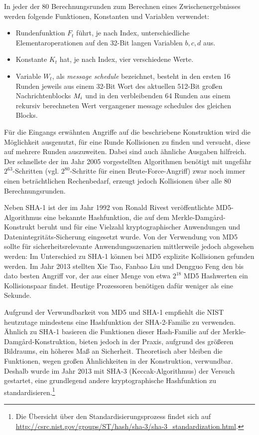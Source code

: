 In jeder der 80 Berechnungsrunden zum Berechnen eines Zwischenergebnisses werden folgende Funktionen, Konstanten und Variablen verwendet:
\begin{itemize}
	\item Rundenfunktion $F_{t}$ führt, je nach Index, unterschiedliche Elementaroperationen auf den 32-Bit langen Variablen $b, c, d$ aus.
	\item Konstante $K_{t}$ hat, je nach Index, vier verschiedene Werte.
	\item Variable $W_{t}$, als \textit{message schedule} bezeichnet, besteht in den ersten 16 Runden jeweils aus einem 32-Bit Wort des aktuellen 512-Bit großen Nachrichtenblocks $M_{i}$ und in den verbleibenden 64 Runden aus einem rekursiv berechneten Wert vergangener message schedules des gleichen Blocks.
\end{itemize}

Für die Eingangs erwähnten Angriffe auf die beschriebene Konstruktion wird die Möglichkeit ausgenutzt, für eine Runde Kollisionen zu finden und versucht, diese auf mehrere Runden auszuweiten. Dabei sind auch ähnliche Ausgaben hilfreich. Der schnellste der im Jahr 2005 vorgestellten Algorithmen benötigt mit ungefähr $2^{63}$-Schritten (vgl. $2^{80}$-Schritte für einen Brute-Force-Angriff) zwar noch immer einen beträchtlichen Rechenbedarf, erzeugt jedoch Kollisionen über alle 80 Berechnungsrunden.

Neben SHA-1 ist der im Jahr 1992 von Ronald Rivest veröffentlichte MD5-Algorithmus eine bekannte Hashfunktion, die auf dem Merkle-Damgård-Konstrukt beruht und für eine Vielzahl kryptographischer Anwendungen und Datenintegritäts-Sicherung eingesetzt wurde. Von der Verwendung von MD5 sollte für sicherheitsrelevante Anwendungsszenarien mittlerweile jedoch abgesehen werden: Im Unterschied zu SHA-1 können bei MD5 explizite Kollisionen gefunden werden. Im Jahr 2013 stellten Xie Tao, Fanbao Liu und Dengguo Feng den bis dato besten Angriff vor, der aus einer Menge von etwa $2^{18}$ MD5 Hashwerten ein Kollisionspaar findet. Heutige Prozessoren benötigen dafür weniger als eine Sekunde.

Aufgrund der Verwundbarkeit von MD5 und SHA-1 empfiehlt die NIST heutzutage mindestens eine Hashfunktion der SHA-2-Familie zu verwenden. Ähnlich zu SHA-1 basieren die Funktionen dieser Hash-Familie auf der Merkle-Damgård-Konstruktion, bieten jedoch in der Praxis, aufgrund des größeren Bildraums, ein höheres Maß an Sicherheit. Theoretisch aber bleiben die Funktionen, wegen großen Ähnlichkeiten in der Konstruktion, verwundbar. Deshalb wurde im Jahr 2013 mit SHA-3 (\glqq Keccak\grqq{}-Algorithmus) der Versuch gestartet, eine grundlegend andere kryptographische Hashfunktion zu standardisieren.\footnote{Die Übersicht über den Standardisierungsprozess findet sich auf \url{http://csrc.nist.gov/groups/ST/hash/sha-3/sha-3_standardization.html}.}


